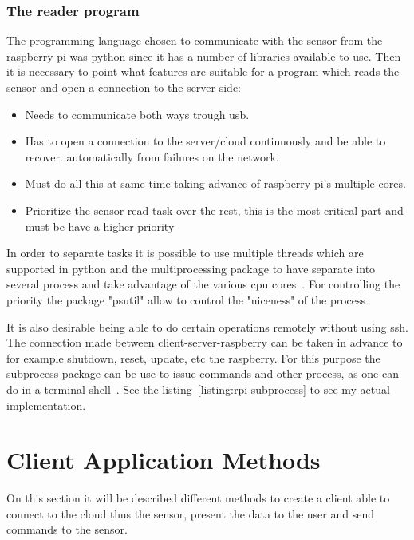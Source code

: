 \documentclass[hidelinks,11pt,a4paper,oneside,article]{memoir}
\begin{document}
\subsubsection{The reader program}
The programming language chosen to communicate with the sensor from the raspberry pi was \gls{python} since it has a number of libraries available to use. Then it is necessary to point what features are suitable for a program which reads the sensor and open a connection to the server side:
\begin{itemize}
    \item Needs to communicate both ways trough \gls{usb}.
    \item Has to open a connection to the server/cloud continuously and be able to recover. automatically from failures on the network.
    \item Must do all this at same time taking advance of raspberry pi's multiple cores.
    \item Prioritize the sensor read task over the rest, this is the most critical part and must be have a higher priority

    
\end{itemize}

In order to separate tasks it is possible to use multiple threads which are supported in \gls{python} and the multiprocessing package to have separate into several process and take advantage of the various \gls{cpu} cores~\cite{python-multi}. For controlling the priority the package "psutil" allow to control the "niceness" of the process~\cite{python-psutil}

It is also desirable being able to do certain operations remotely without using \gls{ssh}. The connection made between client-server-raspberry can be taken in advance to for example shutdown, reset, update, etc the raspberry. For this purpose the subprocess package can be use to issue commands and other process, as one can do in a terminal shell~\cite{python-subprocess}. See the listing~\ref{listing:rpi-subprocess} to see my actual implementation.

\section{Client Application Methods}\label{sec:client-application-methods}
On this section it will be described different methods to create a client able to connect to the cloud thus the sensor, present the data to the user and send commands to the sensor.
\end{document}
